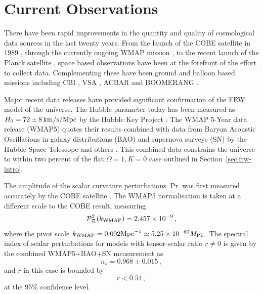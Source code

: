 \section{Current Observations}
\label{sec:obs-intro}
There have been rapid improvements in the quantity and quality of cosmological data
sources in the last twenty years. From the launch of the COBE satellite in
1989 \cite{Bennett1994, Bennett1996c}, through the currently
ongoing WMAP mission \cite{spergel, Komatsu:2008hk}, to the recent launch of the
Planck satellite \cite{planck}, space based observations have been at the
forefront of the effort to collect data. Complementing these have been ground
and balloon based missions including CBI
\cite{Mason2003b, Sievers2003, Sievers2007}, VSA \cite{Dickinson2004}, ACBAR
\cite{Kuo2004, Kuo2007} and BOOMERANG \cite{Ruhl2003, Montroy2006,
Piacentini2006}.

Major recent data releases have provided significant confirmation of the FRW
model of the universe. The Hubble parameter today has been measured as $H_0 =
72\pm8\,\mathrm{km}/\mathrm{s}/\mathrm{Mpc}$ by the Hubble Key Project
\cite{Freedman2001}. The WMAP 5-Year data release (WMAP5) \cite{Komatsu:2008hk}
quotes their results combined with
data from Baryon
Acoustic Oscillations in galaxy distributions (BAO) \cite{Percival2007}
and supernova surveys (SN) by the Hubble Space Telescope and others \cite{Riess2004,
Riess2007, Astier2006, Wood-Vasey2007}. 
This combined data constrains the
universe to within two percent of the flat $\Omega =1, K=0$ case outlined in
Section~\ref{sec:frw-intro}. 

The amplitude of the scalar curvature perturbations $\Pr$ was first measured
accurately by the COBE satellite \cite{Bennett1994, Bennett1996c}. The WMAP5
normalisation is taken at a different scale to the COBE result, measuring
% 
\begin{equation}
 \label{eq:wmapnorm-intro}
 \mathcal{P}_{\mathcal{R}}^2 (k_\mathrm{WMAP}) = 2.457 \times 10^{-9}\,,
\end{equation}
% 
where the pivot scale $k_\mathrm{WMAP} = 0.002\mathrm{Mpc}^{-1} \simeq 5.25\times 10^{-60}M_{\mathrm{PL}}$. The
spectral index of scalar perturbations for models with tensor-scalar ratio
$r\ne0$ is given by the combined WMAP5+BAO+SN measurement as
% 
\begin{equation}
 \label{eq:wmapns-intro}
 n_s = 0.968 \pm 0.015\,,
\end{equation}
% 
and $r$ in this case is bounded by
% 
\begin{equation}
\label{eq:rbound-intro}
 r < 0.54\,,
\end{equation}
at the 95\% confidence level.






